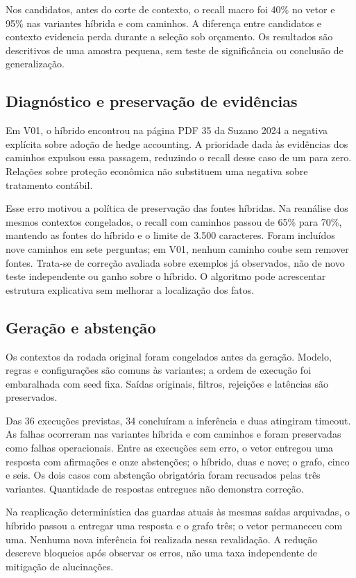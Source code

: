 \documentclass[conference]{IEEEtran}
\begin{document}
Nos candidatos, antes do corte de contexto, o recall macro foi 40\% no vetor e 95\% nas variantes híbrida e com caminhos. A diferença entre candidatos e contexto evidencia perda durante a seleção sob orçamento. Os resultados são descritivos de uma amostra pequena, sem teste de significância ou conclusão de generalização.

\subsection{Diagnóstico e preservação de evidências}

Em V01, o híbrido encontrou na página PDF 35 da Suzano 2024 a negativa explícita sobre adoção de hedge accounting. A prioridade dada às evidências dos caminhos expulsou essa passagem, reduzindo o recall desse caso de um para zero. Relações sobre proteção econômica não substituem uma negativa sobre tratamento contábil.

Esse erro motivou a política de preservação das fontes híbridas. Na reanálise dos mesmos contextos congelados, o recall com caminhos passou de 65\% para 70\%, mantendo as fontes do híbrido e o limite de 3.500 caracteres. Foram incluídos nove caminhos em sete perguntas; em V01, nenhum caminho coube sem remover fontes. Trata-se de correção avaliada sobre exemplos já observados, não de novo teste independente ou ganho sobre o híbrido. O algoritmo pode acrescentar estrutura explicativa sem melhorar a localização dos fatos.

\subsection{Geração e abstenção}

Os contextos da rodada original foram congelados antes da geração. Modelo, regras e configurações são comuns às variantes; a ordem de execução foi embaralhada com seed fixa. Saídas originais, filtros, rejeições e latências são preservados.

Das 36 execuções previstas, 34 concluíram a inferência e duas atingiram timeout. As falhas ocorreram nas variantes híbrida e com caminhos e foram preservadas como falhas operacionais. Entre as execuções sem erro, o vetor entregou uma resposta com afirmações e onze abstenções; o híbrido, duas e nove; o grafo, cinco e seis. Os dois casos com abstenção obrigatória foram recusados pelas três variantes. Quantidade de respostas entregues não demonstra correção.

Na reaplicação determinística das guardas atuais às mesmas saídas arquivadas, o híbrido passou a entregar uma resposta e o grafo três; o vetor permaneceu com uma. Nenhuma nova inferência foi realizada nessa revalidação. A redução descreve bloqueios após observar os erros, não uma taxa independente de mitigação de alucinações.
\end{document}
